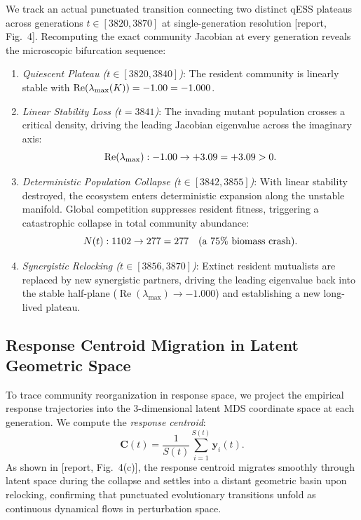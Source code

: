 \documentclass[11pt,a4paper]{article}
\newcommand{\R}[1]{\textcolor{blue!55!black}{[report, #1]}}
\begin{document}
We track an actual punctuated transition connecting two distinct qESS plateaus across generations $t \in [3820, 3870]$ at single-generation resolution \R{Fig.~4}. Recomputing the exact community Jacobian at every generation reveals the microscopic bifurcation sequence:
\begin{enumerate}
\item \textit{Quiescent Plateau ($t \in [3820, 3840]$)}: The resident community is linearly stable with $\operatorname{Re}(\lambda_{\max}(K)) = -1.00 = -1.000$.
\item \textit{Linear Stability Loss ($t = 3841$)}: The invading mutant population crosses a critical density, driving the leading Jacobian eigenvalue across the imaginary axis:
\begin{equation}
\operatorname{Re}(\lambda_{\max}): -1.00 \to +3.09 = +3.09 > 0.
\end{equation}
\item \textit{Deterministic Population Collapse ($t \in [3842, 3855]$)}: With linear stability destroyed, the ecosystem enters deterministic expansion along the unstable manifold. Global competition suppresses resident fitness, triggering a catastrophic collapse in total community abundance:
\begin{equation}
N(t): 1102 \to 277 = 277 \quad (\text{a } 75\% \text{ biomass crash}).
\end{equation}
\item \textit{Synergistic Relocking ($t \in [3856, 3870]$)}: Extinct resident mutualists are replaced by new synergistic partners, driving the leading eigenvalue back into the stable half-plane ($\operatorname{Re}(\lambda_{\max}) \to -1.000$) and establishing a new long-lived plateau.
\end{enumerate}

\subsection{Response Centroid Migration in Latent Geometric Space}

To trace community reorganization in response space, we project the empirical response trajectories into the 3-dimensional latent MDS coordinate space at each generation. We compute the \emph{response centroid}:
\begin{equation}
\mathbf{C}(t) = \frac{1}{S(t)} \sum_{i=1}^{S(t)} \mathbf{y}_i(t).
\end{equation}
As shown in \R{Fig.~4(c)}, the response centroid migrates smoothly through latent space during the collapse and settles into a distant geometric basin upon relocking, confirming that punctuated evolutionary transitions unfold as continuous dynamical flows in perturbation space.
\end{document}
